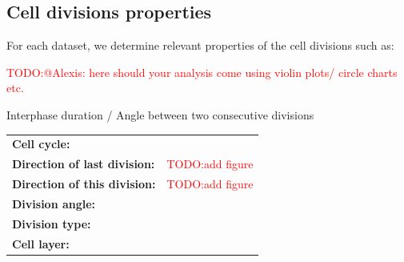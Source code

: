 \documentclass[11pt,a4paper, final]{article}
\newcommand{\TODO}[1]{
\textcolor{red}{TODO:#1}
}
\begin{document}
\subsection{Cell divisions properties}
For each dataset, we determine relevant properties of the cell divisions such as:
\TODO{@Alexis: here should your analysis come using violin plots/ circle charts etc.}
Interphase duration / Angle between two consecutive divisions

\noindent
\begin{tabularx}{\textwidth}{@{} >{\RaggedRight}p{4.5cm} X @{}}
\textbf{Cell cycle:} &
\\
\textbf{Direction of last division:} &
\TODO{add figure}\\
\textbf{Direction of this division:} &
\TODO{add figure}\\
\textbf{Division angle:} &
\\
\textbf{Division type:} &
\\
\textbf{Cell layer:} &
\\
\end{tabularx}

\clearpage
\end{document}
